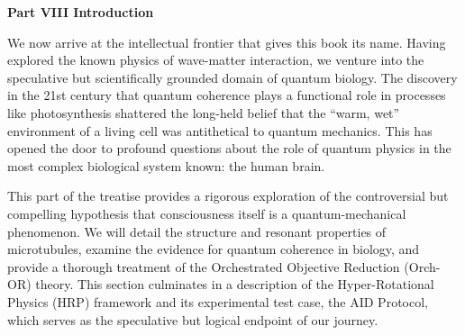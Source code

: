 \newpage
\thispagestyle{empty}

\vspace*{3cm}

\begin{center}
{\Large\lorettadisplay\bfseries Part VIII Introduction}
\end{center}

\vspace{2cm}

We now arrive at the intellectual frontier that gives this book its name. Having explored the known physics of wave-matter interaction, we venture into the speculative but scientifically grounded domain of quantum biology. The discovery in the 21st century that quantum coherence plays a functional role in processes like photosynthesis shattered the long-held belief that the ``warm, wet'' environment of a living cell was antithetical to quantum mechanics. This has opened the door to profound questions about the role of quantum physics in the most complex biological system known: the human brain.

\vspace{1em}

This part of the treatise provides a rigorous exploration of the controversial but compelling hypothesis that consciousness itself is a quantum-mechanical phenomenon. We will detail the structure and resonant properties of microtubules, examine the evidence for quantum coherence in biology, and provide a thorough treatment of the Orchestrated Objective Reduction (Orch-OR) theory. This section culminates in a description of the Hyper-Rotational Physics (HRP) framework and its experimental test case, the AID Protocol, which serves as the speculative but logical endpoint of our journey.

\vspace*{\fill}
\newpage
